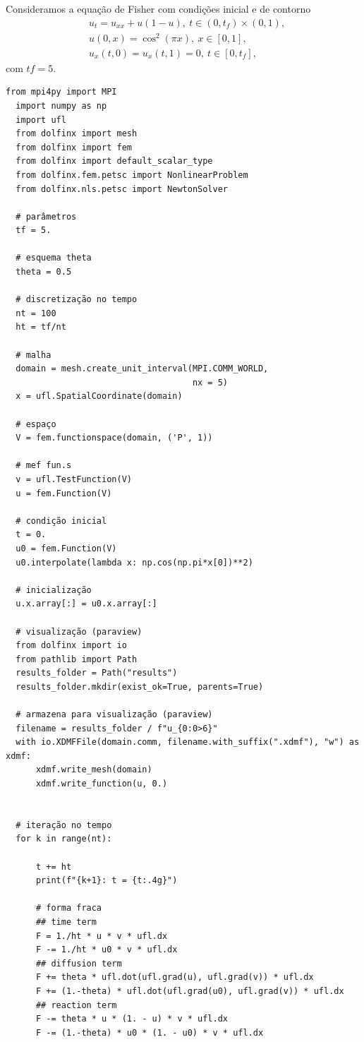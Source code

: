 \begin{ex}
  Consideramos a equação de Fisher com condições inicial e de contorno
  \begin{subequations}
    \begin{align}
      &u_t = u_{xx} + u(1-u), ~t\in(0,t_f)\times(0,1),\\
      &u(0,x) = \cos^2(\pi x), ~x\in[0,1],\\
      &u_x(t,0)=u_x(t,1)=0, ~t\in[0,t_f],
    \end{align}
  \end{subequations}
  com $tf=5$.

\begin{lstlisting}[caption=ex\_mef1d\_fisher.py]
  from mpi4py import MPI
  import numpy as np
  import ufl
  from dolfinx import mesh
  from dolfinx import fem
  from dolfinx import default_scalar_type
  from dolfinx.fem.petsc import NonlinearProblem
  from dolfinx.nls.petsc import NewtonSolver
  
  # parâmetros
  tf = 5.
  
  # esquema theta
  theta = 0.5
  
  # discretização no tempo
  nt = 100
  ht = tf/nt
  
  # malha
  domain = mesh.create_unit_interval(MPI.COMM_WORLD,
                                     nx = 5)
  x = ufl.SpatialCoordinate(domain)
  
  # espaço
  V = fem.functionspace(domain, ('P', 1))
  
  # mef fun.s
  v = ufl.TestFunction(V)
  u = fem.Function(V)
  
  # condição inicial
  t = 0.
  u0 = fem.Function(V)
  u0.interpolate(lambda x: np.cos(np.pi*x[0])**2)
  
  # inicialização
  u.x.array[:] = u0.x.array[:]
  
  # visualização (paraview)
  from dolfinx import io
  from pathlib import Path
  results_folder = Path("results")
  results_folder.mkdir(exist_ok=True, parents=True)
  
  # armazena para visualização (paraview)
  filename = results_folder / f"u_{0:0>6}"
  with io.XDMFFile(domain.comm, filename.with_suffix(".xdmf"), "w") as xdmf:
      xdmf.write_mesh(domain)
      xdmf.write_function(u, 0.)
  
  
  # iteração no tempo
  for k in range(nt):
      
      t += ht
      print(f"{k+1}: t = {t:.4g}")
  
      # forma fraca
      ## time term
      F = 1./ht * u * v * ufl.dx
      F -= 1./ht * u0 * v * ufl.dx
      ## diffusion term
      F += theta * ufl.dot(ufl.grad(u), ufl.grad(v)) * ufl.dx
      F += (1.-theta) * ufl.dot(ufl.grad(u0), ufl.grad(v)) * ufl.dx
      ## reaction term
      F -= theta * u * (1. - u) * v * ufl.dx
      F -= (1.-theta) * u0 * (1. - u0) * v * ufl.dx
  

\end{lstlisting}
\end{ex}

